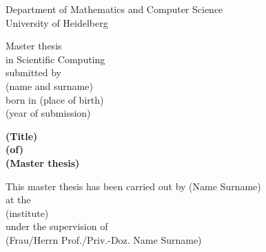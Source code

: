 
\thispagestyle{empty}
\begin{center}
  \renewcommand{\baselinestretch}{2.00}
  \Large\sffamily
  Department of Mathematics and Computer Science\\
  \large University of Heidelberg
  \par\vfill\normalfont
  Master thesis\\
  in Scientific Computing\\
  submitted by\\
  (name and surname)\\
  born in (place of birth)\\
  (year of submission)
\end{center}
\newpage

\thispagestyle{empty}
\begin{center}
  \renewcommand{\baselinestretch}{2.00}
  \Large\bfseries\sffamily
    (Title)\\
    (of)\\
    (Master thesis)
  \par
  \vfill
  \large\normalfont
  This master thesis has been carried out by (Name Surname)\\
  at the\\
  (institute)\\
  under the supervision of\\
  (Frau/Herrn Prof./Priv.-Doz. Name Surname)
\end{center}\par
\vspace{5\baselineskip}

\renewcommand{\baselinestretch}{1.00}\normalsize